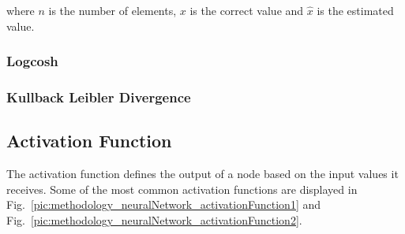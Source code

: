 where $n$ is the number of elements, $x$ is the correct value and $\hat{x}$ is the estimated value.

\subsubsection{Logcosh}

\subsubsection{Kullback Leibler Divergence}

\subsection{Activation Function}
The activation function defines the output of a node based on the input values it receives. Some of the most common activation functions are displayed in Fig.~\ref{pic:methodology_neuralNetwork_activationFunction1} and Fig.~\ref{pic:methodology_neuralNetwork_activationFunction2}.

